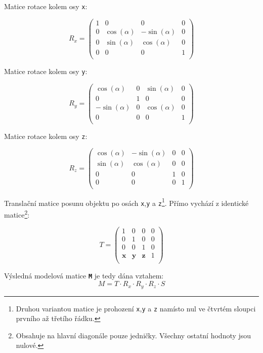 Matice rotace kolem osy \texttt{x}:

$$
R_{x}=
\begin{pmatrix} 
	1 & 0 & 0 & 0\\
	0 & \cos(\alpha) & -\sin(\alpha) & 0\\ 
	0 & \sin(\alpha) & \cos(\alpha) & 0\\ 
	0 & 0 & 0 & 1\\ 
\end{pmatrix}$$

Matice rotace kolem osy \texttt{y}:

$$
R_{y}=
\begin{pmatrix} 
 \cos(\alpha) & 0 & \sin(\alpha) & 0\\
0 & 1 & 0 & 0\\ 
-\sin(\alpha) & 0 & \cos(\alpha) & 0\\ 
0 & 0 & 0 & 1\\ 
\end{pmatrix}$$

Matice rotace kolem osy \texttt{z}:

$$
R_{z}=
\begin{pmatrix} 
\cos(\alpha) & -\sin(\alpha) & 0 & 0\\
\sin(\alpha) & \cos(\alpha) & 0 & 0\\ 
0 & 0 & 1 & 0\\ 
0 & 0 & 0 & 1\\ 
\end{pmatrix}$$

\newpage


Translační matice posunu objektu po osách \texttt{x},\texttt{y} a \texttt{z}\footnote{Druhou variantou matice je prohození \texttt{x},\texttt{y} a \texttt{z}  namísto nul ve čtvrtém sloupci prvního až třetího řádku.}. Přímo vychází z identické matice\footnote{Obsahuje na hlavní diagonále pouze jedničky. Všechny ostatní hodnoty jsou nulové.}:


$$
T =
\begin{pmatrix} 
1 & 0 & 0 & 0\\
0 & 1 & 0 & 0\\ 
0 & 0 & 1 & 0\\ 
\textbf{x} & \textbf{y} & \textbf{z} & 1\\ 
\end{pmatrix}$$



Výsledná modelová matice \texttt{\textbf{M}} je tedy dána vztahem:
$$ M = T \cdot R_{x} \cdot R_{y} \cdot R_{z} \cdot S $$

